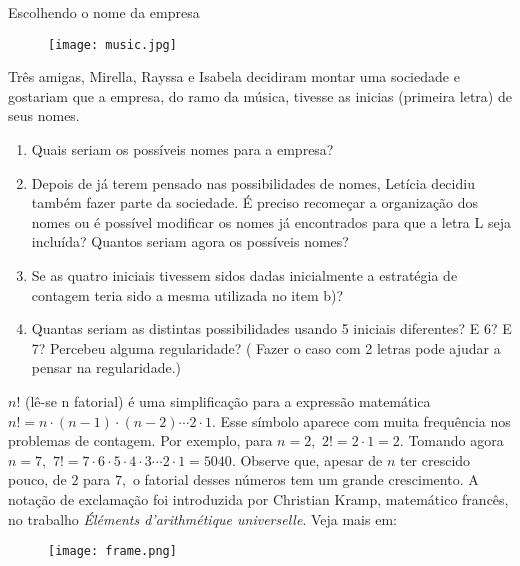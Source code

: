 \begin{task}{Escolhendo o nome da empresa}

\begin{figure}[H]
\centering

\texttt{[image: music.jpg]}
\end{figure}

Três amigas, Mirella, Rayssa  e Isabela decidiram montar uma sociedade e gostariam que a empresa, do ramo da música, tivesse as inicias (primeira letra) de seus nomes.  

\begin{enumerate}

\item Quais seriam os possíveis nomes para a empresa? 

\item Depois de já terem pensado nas possibilidades de nomes, Letícia decidiu também fazer parte da sociedade. É preciso recomeçar a organização dos nomes ou é possível modificar os nomes já encontrados para que a letra L seja incluída? Quantos seriam agora os possíveis nomes?

\item Se as quatro iniciais tivessem sidos dadas inicialmente a estratégia de contagem teria sido a mesma utilizada no item b)?

\item Quantas seriam as distintas possibilidades usando 5 iniciais diferentes? E 6? E 7? Percebeu alguma regularidade? ( Fazer o caso com 2 letras pode ajudar a pensar na regularidade.)

\end{enumerate}

\end{task}

\begin{knowledge}
$n!$ (lê-se n fatorial) é uma simplificação para a expressão matemática $n!=n \cdot (n-1) \cdot (n-2) \cdots 2 \cdot 1.$ Esse símbolo aparece com muita frequência nos problemas de contagem. Por exemplo, para $n=2,$ $2!= 2 \cdot 1 = 2.$ Tomando agora $n=7,$ $7!=7 \cdot 6 \cdot 5 \cdot 4 \cdot 3\cdots 2 \cdot 1 = 5040.$ Observe que, apesar de $n$ ter crescido pouco, de $2$ para $7,$ o fatorial desses números tem um grande crescimento. A notação de exclamação foi introduzida por Christian Kramp, matemático francês, no trabalho \textit{ Éléments d'arithmétique universelle}. Veja mais em:

\begin{figure}[H]
\centering

\texttt{[image: frame.png]}   
\end{figure}
\end{knowledge}


